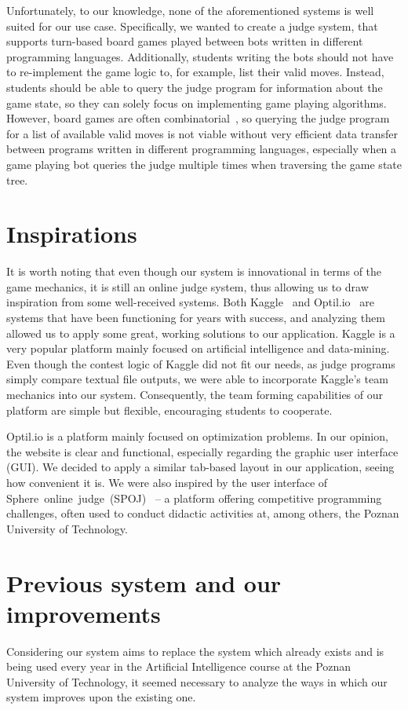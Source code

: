 Unfortunately, to our knowledge, none of the aforementioned systems is well suited for our use case. Specifically, we wanted to create a judge system, that supports turn-based board games played between bots written in different programming languages. Additionally, students writing the bots should not have to re-implement the game logic to, for example, list their valid moves. Instead, students should be able to query the judge program for information about the game state, so they can solely focus on implementing game playing algorithms. However, board games are often combinatorial~\cite{Albert2019}, so querying the judge program for a list of available valid moves is not viable without very efficient data transfer between programs written in different programming languages, especially when a game playing bot queries the judge multiple times when traversing the game state tree.

\section{Inspirations}
It is worth noting that even though our system is innovational in terms of the game mechanics, it is still an online judge system, thus allowing us to draw inspiration from some well-received systems. Both Kaggle~\cite{kaggle} and Optil.io~\cite{Wasik2016} are systems that have been functioning for years with success, and analyzing them allowed us to apply some great, working solutions to our application. Kaggle is a very popular platform mainly focused on artificial intelligence and data-mining. Even though the contest logic of Kaggle did not fit our needs, as judge programs simply compare textual file outputs, we were able to incorporate Kaggle's team mechanics into our system. Consequently, the team forming capabilities of our platform are simple but flexible, encouraging students to cooperate.

Optil.io is a platform mainly focused on optimization problems. In our opinion, the website is clear and functional, especially regarding the graphic user interface (GUI). We decided to apply a similar tab-based layout in our application, seeing how convenient it is.  We were also inspired by the user interface of Sphere~online~judge~(SPOJ)~\cite{spoj} -- a platform offering competitive programming challenges, often used to conduct didactic activities at, among others, the Poznan University of Technology.

\section{Previous system and our improvements}
Considering our system aims to replace the system which already exists and is being used every year in the Artificial Intelligence course at the Poznan University of Technology, it seemed necessary to analyze the ways in which our system improves upon the existing one.

